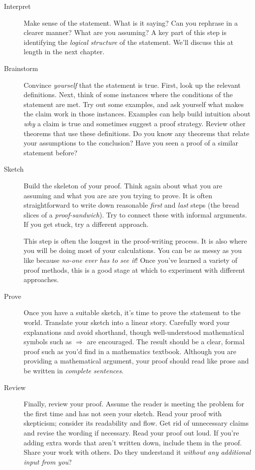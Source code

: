 \begin{description}
	\item[Interpret] Make sense of the statement. What is it saying? Can you rephrase in a clearer manner? What are you assuming? A key part of this step is identifying the \emph{logical structure} of the statement. We'll discuss this at length in the next chapter.
    
	\item[Brainstorm] Convince \emph{yourself} that the statement is true. First, look up the relevant definitions. Next, think of some instances where the conditions of the statement are met. Try out some examples, and ask yourself what makes the claim work in those instances. Examples can help build intuition about \emph{why} a claim is true and sometimes suggest a proof strategy. Review other theorems that use these definitions. Do you know any theorems that relate your assumptions to the conclusion? Have you seen a proof of a similar statement before?

	\item[Sketch] Build the skeleton of your proof. Think again about what you are assuming and what you are are you trying to prove. It is often straightforward to write down reasonable \emph{first} and \emph{last} steps (the bread slices of a \emph{proof-sandwich}). Try to connect these with informal arguments. If you get stuck, try a different approach.\par
	This step is often the longest in the proof-writing process. It is also where you will be doing most of your calculations. You can be as messy as you like because \emph{no-one ever has to see it}! Once you've learned a variety of proof methods, this is a good stage at which to experiment with different approaches.
  
	\item[Prove] Once you have a suitable sketch, it's time to prove the statement to the world. Translate your sketch into a linear story. Carefully word your explanations and avoid shorthand, though well-understood mathematical symbols such as $\Longrightarrow$ are encouraged. The result should be a clear, formal proof such as you'd find in a mathematics textbook. Although you are providing a mathematical argument, your proof should read like prose and be written in \emph{complete sentences}. 

	\item[Review] Finally, review your proof. Assume the reader is meeting the problem for the first time and has not seen your sketch. Read your proof with skepticism; consider its readability and flow. Get rid of unnecessary claims and revise the wording if necessary. Read your proof out loud. If you're adding extra words that aren't written down, include them in the proof. Share your work with others. Do they understand it \emph{without any additional input from you}?
\end{description}

